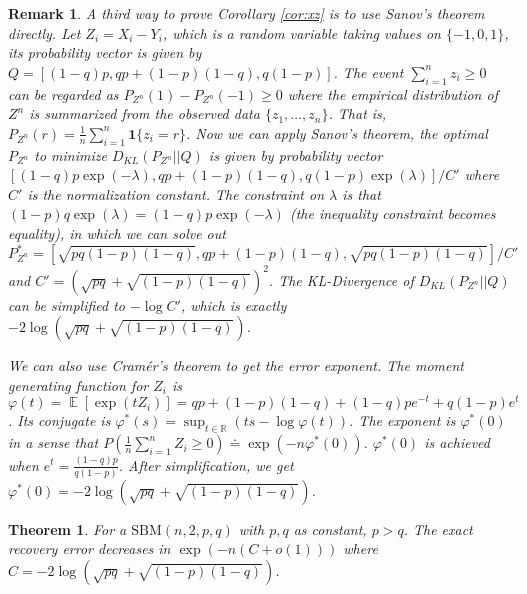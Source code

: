 \documentclass{article}
\newtheorem{theorem}{Theorem}
\newtheorem{remark}{Remark}
\DeclareMathOperator{\E}{\mathbb{E}}
\begin{document}
\begin{remark}
	A third way to prove Corollary \ref{cor:xz} is to use Sanov's theorem directly. Let $Z_i = X_i - Y_i$, which is a random variable
	taking values on $\{-1, 0, 1\}$, its probability vector is given by $Q=[(1-q)p, qp+(1-p)(1-q), q(1-p)]$.
	The event $\sum_{i=1}^n z_i \geq 0 $ can be regarded as $P_{Z^n}(1) - P_{Z^n}(-1) \geq 0$ where the empirical distribution
	of $Z^n$ is summarized from the observed data $\{z_1, \dots, z_n\}$. That is, $P_{Z^n}(r) = \frac{1}{n}\sum_{i=1}^n \bm{1}\{z_i = r\}$.
	Now we can apply Sanov's theorem, the optimal $P_{Z^n}$ to minimize $D_{KL}(P_{Z^n}|| Q)$ is given by
	probability vector $[(1-q)p\exp(-\lambda), qp+(1-p)(1-q), q(1-p)\exp(\lambda)]/C'$ where $C'$ is the normalization constant. The constraint on
	$\lambda$ is that $(1-p)q\exp(\lambda)=(1-q)p\exp(-\lambda)$ (the inequality constraint becomes equality), in which we can solve out
	$P^*_{Z^n} = [\sqrt{pq(1-p)(1-q)}, qp+(1-p)(1-q), \sqrt{pq(1-p)(1-q)}]/C'$ and $C'=(\sqrt{pq}+\sqrt{(1-p)(1-q)})^2$.
	The KL-Divergence of $D_{KL}(P_{Z^n}|| Q)$ can be simplified to $-\log C'$, which is exactly $-2\log (\sqrt{pq}+\sqrt{(1-p)(1-q)})$.
	
	We can also use Cramér's theorem to get the error exponent.
	The moment generating function for $Z_i$ is
	$\varphi(t) = \E[\exp(t Z_i)]
	= qp + (1-p)(1-q) + (1-q)p e^{-t} + q(1-p) e^t$.
	Its conjugate is $\varphi^*(s) = \sup_{t \in \mathbb{R}} (ts - \log \varphi(t))$.
	The exponent is $\varphi^*(0)$ in a sense that $P(\frac{1}{n}\sum_{i=1}^n Z_i\geq 0) \doteq \exp(-n \varphi^*(0))$. $\varphi^*(0)$
	is achieved when $e^t=\frac{(1-q)p}{q(1-p)}$. After simplification,
	we get $\varphi^*(0) = -2\log(\sqrt{pq}+\sqrt{(1-p)(1-q)})$.
\end{remark}
\begin{theorem}\label{thm:2pq}
	For a $\textrm{SBM}(n,2,p, q)$ with $p,q$ as constant, $p > q$. The
	exact recovery error decreases in $\exp(-n (C + o(1)))$
	where $C = -2\log(\sqrt{pq} + \sqrt{(1-p)(1-q)})$.
\end{theorem}
\end{document}
